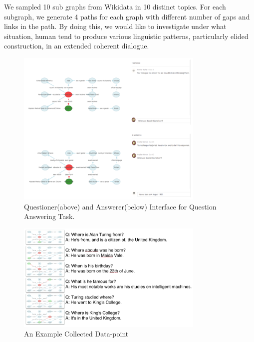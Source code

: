 \documentclass[bsc,frontabs,twoside,singlespacing,parskip,deptreport]{infthesis}     %
\begin{document}
We sampled 10 sub graphs from Wikidata in 10 distinct topics. For each subgraph, we generate 4 paths for each graph with different number of gaps and links in the path. By doing this, we would like to investigate under what situation, human tend to produce various linguistic patterns, particularly elided construction, in an extended coherent dialogue.


\begin{figure}[h]
    \centering
    \includegraphics[width=0.8\textwidth]{qa1.png}
    \caption{Questioner(above) and Answerer(below) Interface for Question Answering Task.}
    \label{fig:kgjson}
\end{figure}


\begin{figure}[h]
    \centering
    \includegraphics[width=0.8\textwidth]{eaxmppledata.png}
    \caption{An Example Collected Data-point}
    \label{fig:exampledata}
\end{figure}
\end{document}
